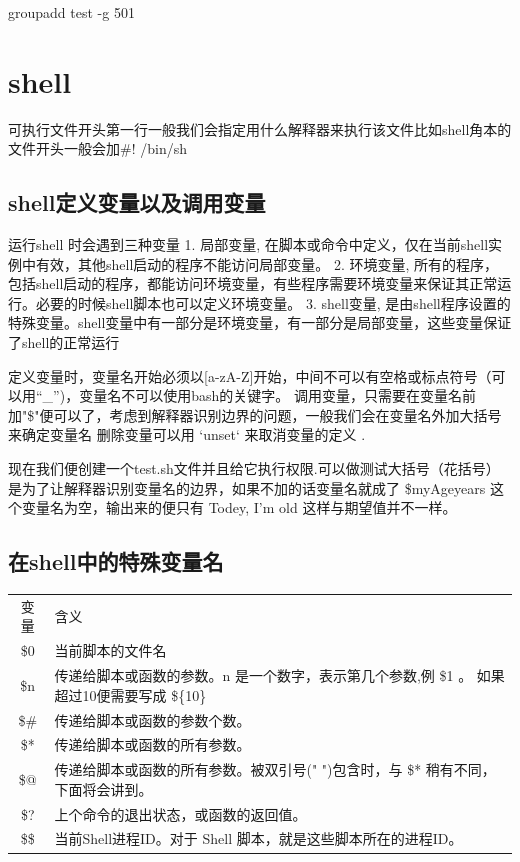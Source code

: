  groupadd test -g 501


\section{shell}
可执行文件开头第一行一般我们会指定用什么解释器来执行该文件比如shell角本的文件开头一般会加\#! /bin/sh


\subsection{shell定义变量以及调用变量}

运行shell 时会遇到三种变量
1. 局部变量, 在脚本或命令中定义，仅在当前shell实例中有效，其他shell启动的程序不能访问局部变量。
2. 环境变量,  所有的程序，包括shell启动的程序，都能访问环境变量，有些程序需要环境变量来保证其正常运行。必要的时候shell脚本也可以定义环境变量。
3. shell变量, 是由shell程序设置的特殊变量。shell变量中有一部分是环境变量，有一部分是局部变量，这些变量保证了shell的正常运行

定义变量时，变量名开始必须以[a-zA-Z]开始，中间不可以有空格或标点符号（可以用“\_”)，变量名不可以使用bash的关键字。
调用变量，只需要在变量名前加"\$"便可以了，考虑到解释器识别边界的问题，一般我们会在变量名外加大括号来确定变量名
删除变量可以用 `unset` 来取消变量的定义 .

现在我们便创建一个test.sh文件并且给它执行权限.可以做测试大括号（花括号）是为了让解释器识别变量名的边界，如果不加的话变量名就成了 \$myAgeyears 这个变量名为空，输出来的便只有 Todey, I'm old  这样与期望值并不一样。

\subsection{在shell中的特殊变量名} 

\begin{tabular}{cl}
变量 & 含义 \\
\$0  & 当前脚本的文件名 \\
\$n  & 传递给脚本或函数的参数。n 是一个数字，表示第几个参数,例 \$1 。 如果超过10便需要写成 \$\{10\} \\
\$\#  & 传递给脚本或函数的参数个数。 \\
\$*  & 传递给脚本或函数的所有参数。 \\
\$@  & 传递给脚本或函数的所有参数。被双引号(" ")包含时，与 \$* 稍有不同，下面将会讲到。 \\
\$?  & 上个命令的退出状态，或函数的返回值。 \\
\$\$  & 当前Shell进程ID。对于 Shell 脚本，就是这些脚本所在的进程ID。 \\
\end{tabular}

